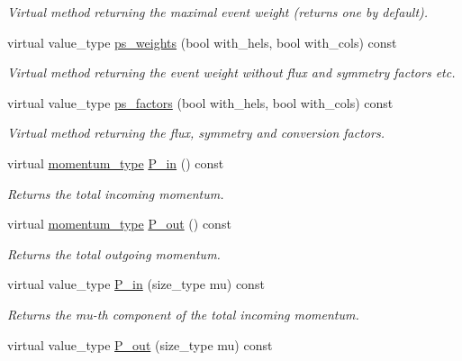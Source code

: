 \begin{DoxyCompactItemize}
\begin{DoxyCompactList}\small\item\em Virtual method returning the maximal event weight (returns one by default). \end{DoxyCompactList}\item 
virtual value\+\_\+type \hyperlink{a00451_a258fb687d61e5a0d9d12d5e1d45db8aa}{ps\+\_\+weights} (bool with\+\_\+hels, bool with\+\_\+cols) const 
\begin{DoxyCompactList}\small\item\em Virtual method returning the event weight without flux and symmetry factors etc. \end{DoxyCompactList}\item 
virtual value\+\_\+type \hyperlink{a00451_aea34ea1dada7a4cece83b42c7d50db55}{ps\+\_\+factors} (bool with\+\_\+hels, bool with\+\_\+cols) const 
\begin{DoxyCompactList}\small\item\em Virtual method returning the flux, symmetry and conversion factors. \end{DoxyCompactList}\item 
\hypertarget{a00451_a4cc227a869306f34f6d34efa01dbd357}{}virtual \hyperlink{a00579}{momentum\+\_\+type} \hyperlink{a00451_a4cc227a869306f34f6d34efa01dbd357}{P\+\_\+in} () const \label{a00451_a4cc227a869306f34f6d34efa01dbd357}

\begin{DoxyCompactList}\small\item\em Returns the total incoming momentum. \end{DoxyCompactList}\item 
\hypertarget{a00451_adbe567091708239995eba7c5897625c0}{}virtual \hyperlink{a00579}{momentum\+\_\+type} \hyperlink{a00451_adbe567091708239995eba7c5897625c0}{P\+\_\+out} () const \label{a00451_adbe567091708239995eba7c5897625c0}

\begin{DoxyCompactList}\small\item\em Returns the total outgoing momentum. \end{DoxyCompactList}\item 
\hypertarget{a00451_a7be32a29baf508f1957bd6f22bd6ae0c}{}virtual value\+\_\+type \hyperlink{a00451_a7be32a29baf508f1957bd6f22bd6ae0c}{P\+\_\+in} (size\+\_\+type mu) const \label{a00451_a7be32a29baf508f1957bd6f22bd6ae0c}

\begin{DoxyCompactList}\small\item\em Returns the mu-\/th component of the total incoming momentum. \end{DoxyCompactList}\item 
\hypertarget{a00451_afadc3f65e1c562102d5067e570c7fda9}{}virtual value\+\_\+type \hyperlink{a00451_afadc3f65e1c562102d5067e570c7fda9}{P\+\_\+out} (size\+\_\+type mu) const \label{a00451_afadc3f65e1c562102d5067e570c7fda9}


\end{DoxyCompactItemize}
